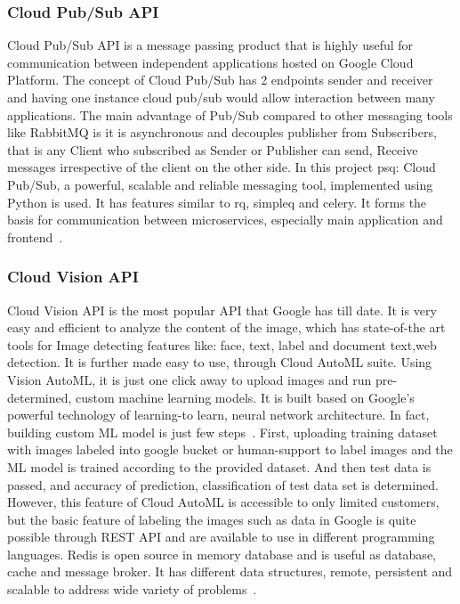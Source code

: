 \subsubsection{Cloud Pub/Sub API}

Cloud Pub/Sub API is a message passing product that is highly useful
for communication between independent applications hosted on Google
Cloud Platform. The concept of Cloud Pub/Sub has 2 endpoints sender
and receiver and having one instance cloud pub/sub would allow
interaction between many applications. The main advantage of Pub/Sub
compared to other messaging tools like RabbitMQ is it is asynchronous
and decouples publisher from Subscribers, that is any Client who
subscribed as Sender or Publisher can send, Receive messages
irrespective of the client on the other side. In this project psq:
Cloud Pub/Sub, a powerful, scalable and reliable messaging tool,
implemented using Python is used. It has features similar to rq,
simpleq and celery. It forms the basis for communication between
microservices, especially main application and
frontend~\cite{hid-sp18-602-pub-sub}.

\subsubsection{Cloud Vision API}

Cloud Vision API is the most popular API that Google has till date. It
is very easy and efficient to analyze the content of the image, which
has state-of-the art tools for Image detecting features like: face,
text, label and document text,web detection.  It is further made easy
to use, through Cloud AutoML suite. Using Vision AutoML, it is just
one click away to upload images and run pre-determined, custom machine
learning models. It is built based on Google’s powerful technology of
learning-to learn, neural network architecture. In fact, building
custom ML model is just few
steps~\cite{hid-sp18-602-cloud-automl}. First, uploading training
dataset with images labeled into google bucket or human-support to
label images and the ML model is trained according to the provided
dataset. And then test data is passed, and accuracy of prediction,
classification of test data set is determined. However, this feature
of Cloud AutoML is accessible to only limited customers, but the basic
feature of labeling the images such as data in Google is quite
possible through REST API and are available to use in different
programming languages.  Redis is open source in memory database and is
useful as database, cache and message broker. It has different data
structures, remote, persistent and scalable to address wide variety of
problems~\cite{hid-sp18-602-cloud-vision}.

